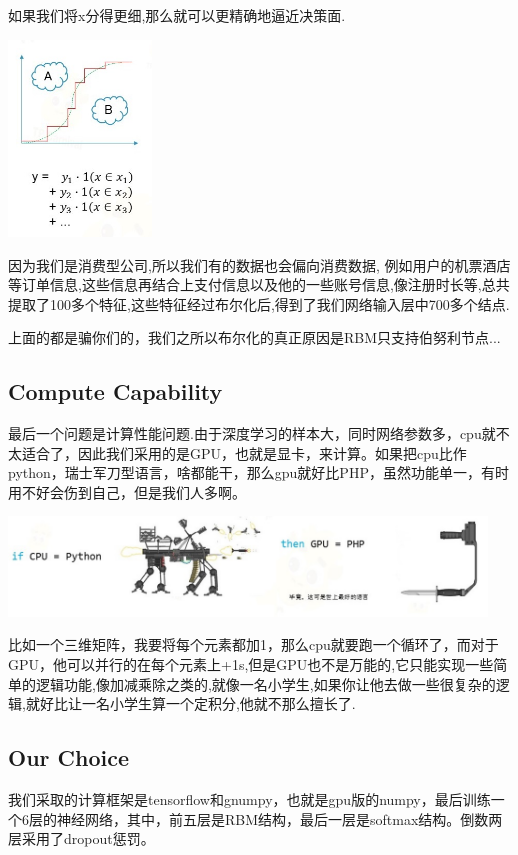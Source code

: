 \documentclass{article}
\begin{document}
如果我们将x分得更细,那么就可以更精确地逼近决策面.

\begin{center}
\includegraphics[width=1.5in]{image/image273.jpg}
\end{center}

因为我们是消费型公司,所以我们有的数据也会偏向消费数据, 例如用户的机票酒店等订单信息,这些信息再结合上支付信息以及他的一些账号信息,像注册时长等,总共提取了100多个特征,这些特征经过布尔化后,得到了我们网络输入层中700多个结点.

上面的都是骗你们的，我们之所以布尔化的真正原因是RBM只支持伯努利节点...

\subsection{Compute Capability}
最后一个问题是计算性能问题.由于深度学习的样本大，同时网络参数多，cpu就不太适合了，因此我们采用的是GPU，也就是显卡，来计算。如果把cpu比作python，瑞士军刀型语言，啥都能干，那么gpu就好比PHP，虽然功能单一，有时用不好会伤到自己，但是我们人多啊。

\begin{center}
\includegraphics[width=5in]{image/image29.jpg}
\end{center}

比如一个三维矩阵，我要将每个元素都加1，那么cpu就要跑一个循环了，而对于GPU，他可以并行的在每个元素上+1s,但是GPU也不是万能的,它只能实现一些简单的逻辑功能,像加减乘除之类的,就像一名小学生,如果你让他去做一些很复杂的逻辑,就好比让一名小学生算一个定积分,他就不那么擅长了.

\subsection{Our Choice}
我们采取的计算框架是tensorflow和gnumpy，也就是gpu版的numpy，最后训练一个6层的神经网络，其中，前五层是RBM结构，最后一层是softmax结构。倒数两层采用了dropout惩罚。
\end{document}
